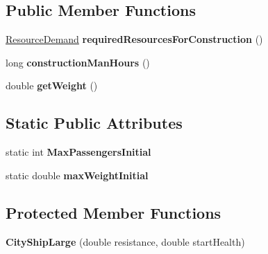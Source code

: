 \subsection*{Public Member Functions}
\begin{DoxyCompactItemize}
\item 
\hyperlink{classuniverse_1_1_resource_demand}{Resource\+Demand} {\bfseries required\+Resources\+For\+Construction} ()\hypertarget{classtools_1_1vehicles_1_1space_1_1_city_ship_large_a95a5dc67b8194d47acbf2f78981cfaee}{}\label{classtools_1_1vehicles_1_1space_1_1_city_ship_large_a95a5dc67b8194d47acbf2f78981cfaee}

\item 
long {\bfseries construction\+Man\+Hours} ()\hypertarget{classtools_1_1vehicles_1_1space_1_1_city_ship_large_a201b6b51cc59ad17b4344cdaa5d3fb54}{}\label{classtools_1_1vehicles_1_1space_1_1_city_ship_large_a201b6b51cc59ad17b4344cdaa5d3fb54}

\item 
double {\bfseries get\+Weight} ()\hypertarget{classtools_1_1vehicles_1_1space_1_1_city_ship_large_acb27e72428bcda23e145fa4541ba47b7}{}\label{classtools_1_1vehicles_1_1space_1_1_city_ship_large_acb27e72428bcda23e145fa4541ba47b7}

\end{DoxyCompactItemize}
\subsection*{Static Public Attributes}
\begin{DoxyCompactItemize}
\item 
static int {\bfseries Max\+Passengers\+Initial}\hypertarget{classtools_1_1vehicles_1_1space_1_1_city_ship_large_ad2871fa2ff5c0ecae9cfda484f5a5c90}{}\label{classtools_1_1vehicles_1_1space_1_1_city_ship_large_ad2871fa2ff5c0ecae9cfda484f5a5c90}

\item 
static double {\bfseries max\+Weight\+Initial}\hypertarget{classtools_1_1vehicles_1_1space_1_1_city_ship_large_a1b4ba8a4377bf3d3ffb6ad491dd009b3}{}\label{classtools_1_1vehicles_1_1space_1_1_city_ship_large_a1b4ba8a4377bf3d3ffb6ad491dd009b3}

\end{DoxyCompactItemize}
\subsection*{Protected Member Functions}
\begin{DoxyCompactItemize}
\item 
{\bfseries City\+Ship\+Large} (double resistance, double start\+Health)\hypertarget{classtools_1_1vehicles_1_1space_1_1_city_ship_large_a381ba9b0b4b7f0a8c032238efcd6615b}{}\label{classtools_1_1vehicles_1_1space_1_1_city_ship_large_a381ba9b0b4b7f0a8c032238efcd6615b}

\end{DoxyCompactItemize}
